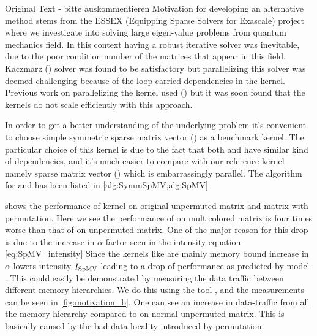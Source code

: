 {\GW Original Text - bitte auskommentieren
Motivation for developing an alternative method stems from the ESSEX (Equipping Sparse Solvers for Exascale) project \cite{ESSEX}
 where we investigate into solving large eigen-value problems from quantum mechanics field. In this context having a robust iterative solver was inevitable, due to the poor condition number of the matrices that appear in this field. Kaczmarz (\KACZ) solver was found to be satisfactory but parallelizing this solver was deemed challenging because of the loop-carried dependencies in the kernel. Previous work on parallelizing the \KACZ kernel used \MCfull (\MC) \cite{feast_mc} but it was soon found that the kernels do not scale efficiently with this approach.

  In order to get a better understanding of the underlying problem it's convenient to choose simple symmetric sparse matrix vector (\SymmSpmv) as a benchmark kernel. The particular choice of this kernel is due to the fact that both \KACZ and \SymmSpmv have similar kind of dependencies, and it's much easier to compare with our reference kernel namely sparse matrix vector (\SpMV) which is embarrassingly parallel. The algorithm for \SymmSpmv  and \SpMV has been listed in \cref{alg:SymmSpMV,alg:SpMV}
  }
  
   
 
  

  shows the performance of \SpMV kernel on original unpermuted matrix and matrix with \MC permutation. Here we see the performance of \SpMV on multicolored matrix is  four times  worse than that of  \SpMV on unpermuted matrix. One of the major reason for this drop is due to the increase in $\alpha$ factor seen in the intensity equation \cref{eq:SpMV_intensity}  Since the kernels like \SpMV  are mainly memory bound increase in $\alpha$ lowers intensity $I_\mathrm{SpMV}$ leading to a drop of performance as predicted by \roofline model \cite{Williams_roofline}. This could easily be demonstrated by measuring the data traffic between different memory hierarchies.  We do this using the \LIKWID tool \cite{LIKWID}, and the measurements can be seen in \cref{fig:motivation_b}. One can see an increase in data-traffic from all the memory hierarchy compared to \SpMV on normal unpermuted matrix. This is basically caused by the bad data locality introduced by \MCfull permutation.
 
